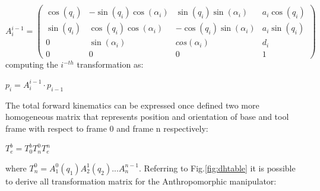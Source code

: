 \vspace{1cm}
$
A^{i-1}_{i} =
\left(
\begin{matrix}
	\cos{(q_i)} & -\sin{(q_i)}\cos{(\alpha_i)} & \sin{(q_i)}\sin{(\alpha_i)}  & a_i\cos{(q_{i})} \\ 
	\sin{(q_i)} & \cos{(q_{i})}\cos{(\alpha_i)} & -\cos{(q_i)}\sin{(\alpha_i)} & a_i\sin{(q_{i})} \\ 
	0 & \sin{(\alpha_i)} & cos{(\alpha_i)} & d_i \\ 
	0 & 0  & 0  & 1
\end{matrix} 
\right)
$\newpage
computing the $i^{-th}$ transformation as:
\begin{center}
	$p_i = A^{i-1}_{i} \cdot p_{i-1}$
\end{center}
The total forward kinematics can be expressed once defined two more homogeneous matrix that represents position and orientation of base and tool frame with respect to frame 0 and frame n respectively:
\begin{center}
$T^b_e = T^b_0T^0_nT^n_e$	
\end{center}
where $T^0_n = A^0_1(q_1)A^1_2(q_2)...A^{n-1}_n$.\newline
Referring to Fig.\ref{fig:dhtable} it is possible to derive all transformation matrix for the Anthropomorphic manipulator:
